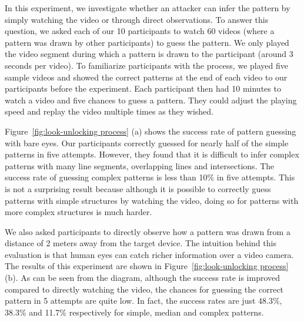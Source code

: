    In this experiment, we investigate whether an attacker can infer the pattern by
   simply watching the video or through direct observations. To answer this question, we asked each of our 10 participants to watch 60 videos (where
   a pattern was drawn by other participants) to guess the pattern.  We
    only played the video segment during which a pattern is drawn to the participant (around 3 seconds per video).
   To familiarize participants with the process, we
    played  five sample videos and showed the correct patterns at the end of each video to our participants before the experiment.
   Each participant then had 10 minutes to watch a video and five chances to guess a pattern. They could adjust the playing speed and
   replay the video multiple times as they wished.


        Figure~\ref{fig:look-unlocking process} (a) shows the success rate of pattern guessing with
        bare eyes. Our participants correctly guessed for nearly half of the
        simple patterns in five attempts. However, they found that it is difficult
        to infer complex patterns with many line segments, overlapping lines and intersections.
        The success rate of guessing complex patterns is less than 10\% in five attempts.
        This is not a surprising result
        because although it is possible to correctly guess patterns with
        simple structures by watching the video, doing so for patterns with
        more complex structures is much harder.


    We also asked participants to directly observe how a pattern was drawn
    from a distance of 2 meters away from the target device. The intuition
    behind this evaluation is that human eyes can catch richer information
    over a video camera. The results of this experiment are shown in
    Figure~\ref{fig:look-unlocking process} (b).  As can be seen from the
    diagram, although the success rate is improved compared to directly watching the video, the chances for guessing the correct pattern in
    5 attempts are quite low. In
    fact, the success rates are just 48.3\%, 38.3\%
    and 11.7\% respectively for simple, median and complex patterns.

